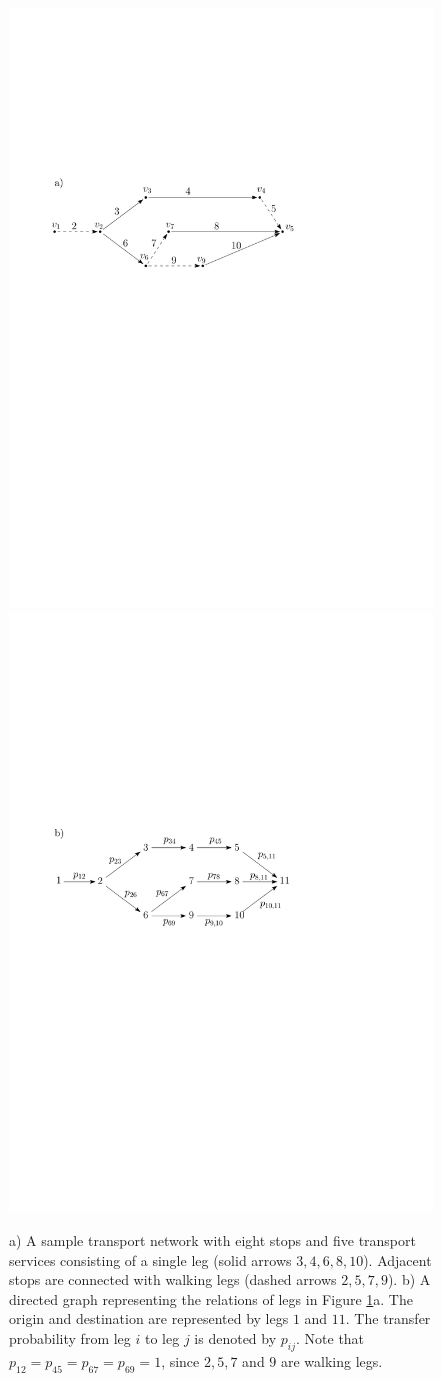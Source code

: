 \documentclass[dissertation,draft*]{aaltoseries}
\begin{document}
\begin{figure}[ht]
\begin{center}
\includegraphics[width=0.45 \columnwidth]{walking02}
\hfill   
\includegraphics[width=0.45 \columnwidth]{walking02c}
\end{center}
\caption{a) A sample transport network with eight stops and five 
transport services consisting of a single leg (solid arrows $3,4,6,8,10$).
Adjacent stops are connected with walking legs (dashed arrows $2,5,7,9$).
b) A directed graph representing the relations of legs in Figure \ref{walking01}a. 
The origin and destination are represented by legs $1$ and $11$. 
The transfer probability from leg $i$ to leg $j$  is denoted by $p_{ij}$.
Note that $p_{12}=p_{45}=p_{67}=p_{69}=1$, since $2,5,7$ and $9$ are walking legs.
}
\label{walking01}
\end{figure}
\end{document}
